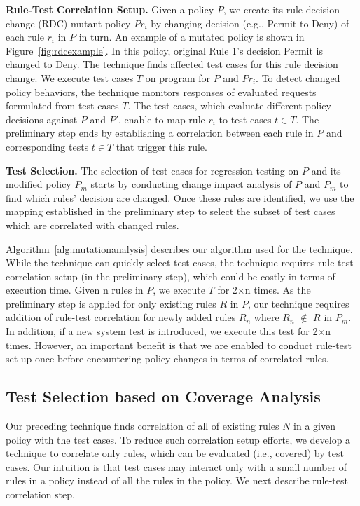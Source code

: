 \textbf{Rule-Test Correlation Setup.} Given a policy $P$, we create its rule-decision-change (RDC) mutant policy $Pr_i$ by changing decision (e.g., Permit to Deny) of each rule $r_i$ in $P$ in turn.
An example of a mutated policy is shown in Figure~\ref{fig:rdcexample}. In this policy, 
original Rule 1's decision Permit is changed to Deny. The technique finds affected test cases for this rule decision change. 
We execute test cases $T$ on program for $P$ and $Pr_i$. To detect changed policy behaviors, 
the technique monitors responses of evaluated requests formulated from test cases $T$. The test cases, which evaluate different 
policy decisions against $P$ and $P'$, enable to map rule $r_i$ to test cases $t \in T$. The preliminary step ends by establishing 
a correlation between each rule in $P$ and corresponding tests $t \in T$ that trigger this rule.

\textbf{Test Selection.} 
The selection of test cases for regression testing on $P$ and its modified policy $P_m$ starts by conducting change impact analysis 
of $P$ and $P_m$ to find which rules' decision are changed. 
Once these rules are identified, we use the mapping established in the preliminary step to select the subset of 
test cases which are correlated with changed rules.

Algorithm~\ref{alg:mutationanalysis} describes our algorithm used for the technique.
While the technique can quickly select test cases, the technique requires rule-test correlation setup 
(in the preliminary step), which could be costly in terms of execution time. Given n rules in $P$, we execute $T$ for 2$\times$n times. 
As the preliminary step is applied for only existing rules $R$ in $P$, our technique requires addition of rule-test
correlation for newly added rules $R_n$ where $R_n$ $\notin$ $R$ in $P_m$. 
In addition, if a new system test is introduced, we execute this test for 2$\times$n times.
However, an important benefit is that we are enabled to conduct rule-test set-up once before encountering policy 
changes in terms of correlated rules. 


\subsection{Test Selection based on Coverage Analysis}
Our preceding technique finds correlation of all of existing rules $N$ in a given policy with the test cases. To reduce
such correlation setup efforts, we develop a technique to correlate only rules, which can be evaluated (i.e., covered)
by test cases. Our intuition is that test cases may interact only with a small number of rules in a policy
instead of all the rules in the policy. We next describe rule-test correlation step.



